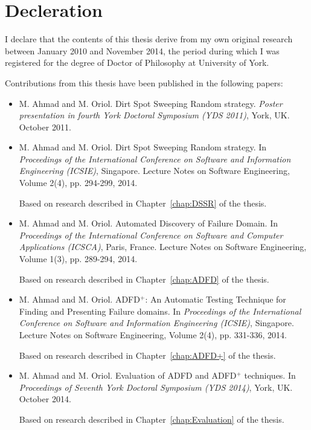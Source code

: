 \chapter*{Decleration}

I declare that the contents of this thesis derive from my own original research between January 2010 and November 2014, the period during which I was registered for the degree of Doctor of Philosophy at University of York.

Contributions from this thesis have been published in the following papers: 

\begin{itemize}

\item M. Ahmad and M. Oriol. Dirt Spot Sweeping Random strategy. \textit{Poster presentation in fourth York Doctoral Symposium (YDS 2011)}, York, UK. October 2011.

\item M. Ahmad and M. Oriol. Dirt Spot Sweeping Random strategy. In \textit{Proceedings of the International Conference on Software and Information Engineering (ICSIE)}, Singapore. Lecture Notes on Software Engineering, Volume 2(4), pp. 294-299, 2014.

Based on research described in Chapter~\ref{chap:DSSR} of the thesis.\\

\item M. Ahmad and M. Oriol. Automated Discovery of Failure Domain. In \textit{Proceedings of the International Conference on Software and Computer Applications (ICSCA)}, Paris, France. Lecture Notes on Software Engineering, Volume 1(3), pp. 289-294, 2014.

Based on research described in Chapter~\ref{chap:ADFD} of the thesis.\\

\item M. Ahmad and M. Oriol. ADFD$^+$: An Automatic Testing Technique for Finding and Presenting Failure domains. In \textit{Proceedings of the International Conference on Software and Information Engineering (ICSIE)}, Singapore. Lecture Notes on Software Engineering, Volume 2(4), pp. 331-336, 2014.

Based on research described in Chapter~\ref{chap:ADFD+} of the thesis.\\

\item M. Ahmad and M. Oriol. Evaluation of ADFD and ADFD$^+$ techniques. In \textit{Proceedings of Seventh York Doctoral Symposium (YDS 2014)}, York, UK. October 2014. 

Based on research described in Chapter~\ref{chap:Evaluation} of the thesis.

\end{itemize}

